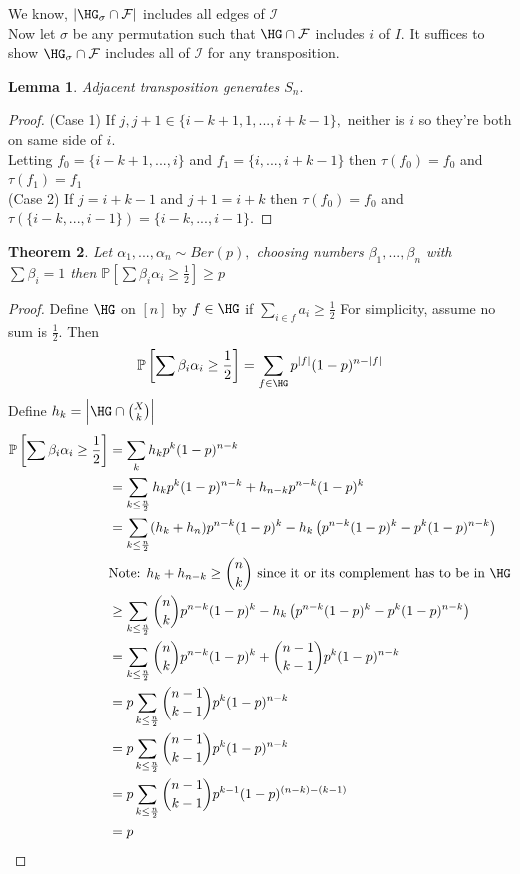 \documentclass[a4paper]{article}
\newtheorem{thm}{Theorem}[section]
\newtheorem{lem}[thm]{Lemma}
\begin{document}
We know, $|\HG_\sigma\cap \mathcal{F}|$ includes all edges of $\mathcal{I}$\\
Now let $\sigma$ be any permutation such that $\HG\cap \mathcal{F}$ includes $i$ of $I.$ It suffices to show $\HG_\sigma\cap \mathcal{F}$ includes all of $\mathcal{I}$ for any transposition.\\
\begin{lem}
    Adjacent transposition generates $S_n.$
\end{lem}
\begin{proof}
    (Case 1) If $j,j+1\in \{i-k+1,1,...,i+k-1\},$ neither is $i$ so they're both on same side of $i.$\\
Letting $f_0=\{i-k+1,...,i\}$ and $f_1=\{i,...,i+k-1\}$ then $\tau(f_0)=f_0$ and $\tau(f_1)=f_1$\\
(Case 2) If $j=i+k-1$ and $j+1=i+k$ then $\tau(f_0)=f_0$ and $\tau(\{i-k,...,i-1\})=\{i-k,...,i-1\}.$
\end{proof}
\begin{thm}
    Let $\alpha_1,...,\alpha_n\sim Ber(p),$ choosing numbers $\beta_1,...,\beta_n$ with $\sum\beta_i=1$ then $\mathbb{P}[\sum\beta_i\alpha_i\geq \frac{1}{2}]\geq p$
\end{thm}
\begin{proof} Define $\HG$ on $[n]$ by $f\in \HG$ if $\sum_{i\in f}a_i\geq \frac{1}{2}$
    For simplicity, assume no sum is $\frac{1}{2}.$
        Then $$\mathbb{P}\left [\sum\beta_i\alpha_i\geq \frac{1}{2}\right ]=\sum_{f\in \HG}p^{|f|}(1-p)^{n-|f|}$$
        Define $h_k=\left |\HG\cap {X \choose k}\right |$
        \begin{align*}
            \mathbb{P}\left [\sum\beta_i\alpha_i\geq \frac{1}{2}\right ]&=\sum_kh_kp^k(1-p)^{n-k}\\
            &=\sum_{k\leq \frac{n}{2}}h_kp^k(1-p)^{n-k}+h_{n-k}p^{n-k}(1-p)^k\\
            &=\sum_{k\leq \frac{n}{2}}(h_k+h_n)p^{n-k}(1-p)^{k}-h_{k}\left (p^{n-k}(1-p)^k-p^k(1-p)^{n-k}\right )\\
            &\text{Note: $h_k+h_{n-k}\geq {n \choose k}$ since it or its complement has to be in $\HG$}\\
            &\geq \sum_{k\leq \frac{n}{2}}{n \choose k}p^{n-k}(1-p)^{k}-h_{k}\left (p^{n-k}(1-p)^k-p^k(1-p)^{n-k}\right )\\
            &=\sum_{k\leq \frac{n}{2}}{n \choose k}p^{n-k}(1-p)^{k}+{n-1 \choose k-1}p^k(1-p)^{n-k}\\
            &=p\sum_{k\leq \frac{n}{2}}{n-1 \choose k-1}p^k(1-p)^{n-k}\\
            &=p\sum_{k\leq \frac{n}{2}}{n-1 \choose k-1}p^k(1-p)^{n-k}\\
            &=p\sum_{k\leq \frac{n}{2}}{n-1 \choose k-1}p^{k-1}(1-p)^{(n-k)-(k-1)}\\
            &=p
        \end{align*}
    \end{proof}
\end{document}
